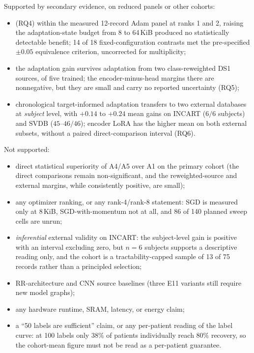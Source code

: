 Supported by secondary evidence, on reduced panels or other cohorts:
\begin{itemize}[leftmargin=*]
\item (RQ4) within the measured 12-record Adam panel at ranks 1 and 2, raising
the adaptation-state budget from 8 to 64\,KiB produced no statistically
detectable benefit; 14 of 18 fixed-configuration contrasts met the
pre-specified $\pm 0.05$ equivalence criterion, uncorrected for multiplicity;
\item the adaptation gain survives adaptation from two class-reweighted DS1
sources, of five trained; the encoder-minus-head margins there are nonnegative,
but they are small and carry no reported uncertainty (RQ5);
\item chronological target-informed adaptation transfers to two external
databases at \emph{subject} level, with $+0.14$ to $+0.24$ mean gains on INCART
($6/6$ subjects) and SVDB ($45$--$46/46$); encoder LoRA has the higher mean on
both external subsets, without a paired direct-comparison interval (RQ6).
\end{itemize}

Not supported:
\begin{itemize}[leftmargin=*]
\item direct statistical superiority of A4/A5 over A1 on the primary cohort (the
direct comparisons remain non-significant, and the reweighted-source and
external margins, while consistently positive, are small);
\item any optimizer ranking, or any rank-4/rank-8 statement: SGD is measured only
at 8\,KiB, SGD-with-momentum not at all, and 86 of 140 planned sweep cells are
unrun;
\item \emph{inferential} external validity on INCART: the subject-level gain is
positive with an interval excluding zero, but $n = 6$ subjects supports a
descriptive reading only, and the cohort is a tractability-capped sample of 13 of
75 records rather than a principled selection;
\item RR-architecture and CNN source baselines (three E11 variants still require
new model graphs);
\item any hardware runtime, SRAM, latency, or energy claim;
\item a ``50 labels are sufficient'' claim, or any per-patient reading of the
label curve: at 100 labels only $38\%$ of patients individually reach $80\%$
recovery, so the cohort-mean figure must not be read as a per-patient guarantee.
\end{itemize}

